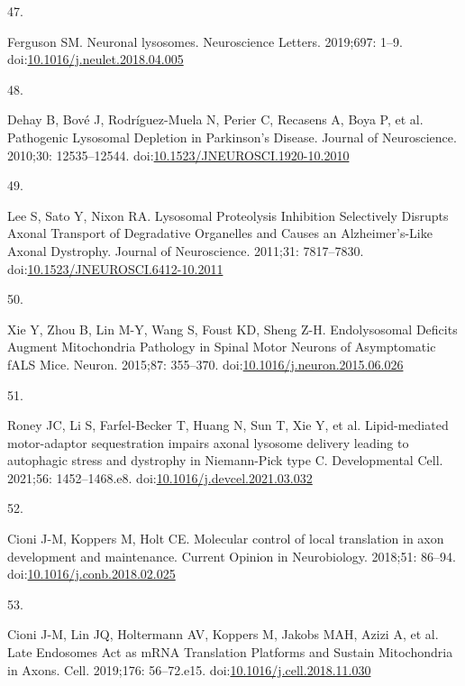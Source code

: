 \documentclass[
  12pt,
  a4paper,
]{book}
\newlength{\cslhangindent}
\newlength{\csllabelwidth}
\newlength{\cslentryspacingunit} %
\newenvironment{CSLReferences}[2] %
 {%
  \setlength{\parindent}{0pt}
  \ifodd #1
  \let\oldpar\par
  \def\par{\hangindent=\cslhangindent\oldpar}
  \fi
  \setlength{\parskip}{#2\cslentryspacingunit}
 }%
 {}
\newcommand{\CSLLeftMargin}[1]{\parbox[t]{\csllabelwidth}{#1}}
\newcommand{\CSLRightInline}[1]{\parbox[t]{\linewidth - \csllabelwidth}{#1}\break}
\begin{document}
\begin{CSLReferences}{0}{0}
\leavevmode{}%
\CSLLeftMargin{47. }%
\CSLRightInline{Ferguson SM. Neuronal lysosomes. Neuroscience Letters. 2019;697: 1--9. doi:\href{https://doi.org/10.1016/j.neulet.2018.04.005}{10.1016/j.neulet.2018.04.005}}

\leavevmode{}%
\CSLLeftMargin{48. }%
\CSLRightInline{Dehay B, Bové J, Rodríguez-Muela N, Perier C, Recasens A, Boya P, et al. Pathogenic {Lysosomal Depletion} in {Parkinson}'s {Disease}. Journal of Neuroscience. 2010;30: 12535--12544. doi:\href{https://doi.org/10.1523/JNEUROSCI.1920-10.2010}{10.1523/JNEUROSCI.1920-10.2010}}

\leavevmode{}%
\CSLLeftMargin{49. }%
\CSLRightInline{Lee S, Sato Y, Nixon RA. Lysosomal {Proteolysis Inhibition Selectively Disrupts Axonal Transport} of {Degradative Organelles} and {Causes} an {Alzheimer}'s-{Like Axonal Dystrophy}. Journal of Neuroscience. 2011;31: 7817--7830. doi:\href{https://doi.org/10.1523/JNEUROSCI.6412-10.2011}{10.1523/JNEUROSCI.6412-10.2011}}

\leavevmode{}%
\CSLLeftMargin{50. }%
\CSLRightInline{Xie Y, Zhou B, Lin M-Y, Wang S, Foust KD, Sheng Z-H. Endolysosomal {Deficits Augment Mitochondria Pathology} in {Spinal Motor Neurons} of {Asymptomatic fALS Mice}. Neuron. 2015;87: 355--370. doi:\href{https://doi.org/10.1016/j.neuron.2015.06.026}{10.1016/j.neuron.2015.06.026}}

\leavevmode{}%
\CSLLeftMargin{51. }%
\CSLRightInline{Roney JC, Li S, Farfel-Becker T, Huang N, Sun T, Xie Y, et al. Lipid-mediated motor-adaptor sequestration impairs axonal lysosome delivery leading to autophagic stress and dystrophy in {Niemann-Pick} type {C}. Developmental Cell. 2021;56: 1452--1468.e8. doi:\href{https://doi.org/10.1016/j.devcel.2021.03.032}{10.1016/j.devcel.2021.03.032}}

\leavevmode{}%
\CSLLeftMargin{52. }%
\CSLRightInline{Cioni J-M, Koppers M, Holt CE. Molecular control of local translation in axon development and maintenance. Current Opinion in Neurobiology. 2018;51: 86--94. doi:\href{https://doi.org/10.1016/j.conb.2018.02.025}{10.1016/j.conb.2018.02.025}}

\leavevmode{}%
\CSLLeftMargin{53. }%
\CSLRightInline{Cioni J-M, Lin JQ, Holtermann AV, Koppers M, Jakobs MAH, Azizi A, et al. Late {Endosomes Act} as {mRNA Translation Platforms} and {Sustain Mitochondria} in {Axons}. Cell. 2019;176: 56--72.e15. doi:\href{https://doi.org/10.1016/j.cell.2018.11.030}{10.1016/j.cell.2018.11.030}}


\end{CSLReferences}
\end{document}

